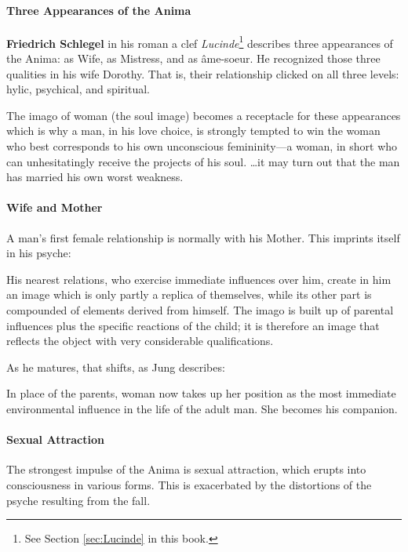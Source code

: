 \paragraph{Three Appearances of the Anima}
\textbf{Friedrich Schlegel} in his roman a clef \emph{Lucinde}\footnote{See Section \ref{sec:Lucinde} in this book.} describes three appearances of the Anima: as Wife, as Mistress, and as âme-soeur. He recognized those three qualities in his wife Dorothy. That is, their relationship clicked on all three levels: hylic, psychical, and spiritual.

\begin{quotex}
The imago of woman (the soul image) becomes a receptacle for these appearances which is why a man, in his love choice, is strongly tempted to win the woman who best corresponds to his own unconscious femininity—a woman, in short who can unhesitatingly receive the projects of his soul. …it may turn out that the man has married his own worst weakness. 

\end{quotex}
\paragraph{Wife and Mother}
A man's first female relationship is normally with his Mother. This imprints itself in his psyche:

\begin{quotex}
His nearest relations, who exercise immediate influences over him, create in him an image which is only partly a replica of themselves, while its other part is compounded of elements derived from himself. The imago is built up of parental influences plus the specific reactions of the child; it is therefore an image that reflects the object with very considerable qualifications. 

\end{quotex}
As he matures, that shifts, as Jung describes:

\begin{quotex}
In place of the parents, woman now takes up her position as the most immediate environmental influence in the life of the adult man. She becomes his companion. 

\end{quotex}
\paragraph{Sexual Attraction}
The strongest impulse of the Anima is sexual attraction, which erupts into consciousness in various forms. This is exacerbated by the distortions of the psyche resulting from the fall.

